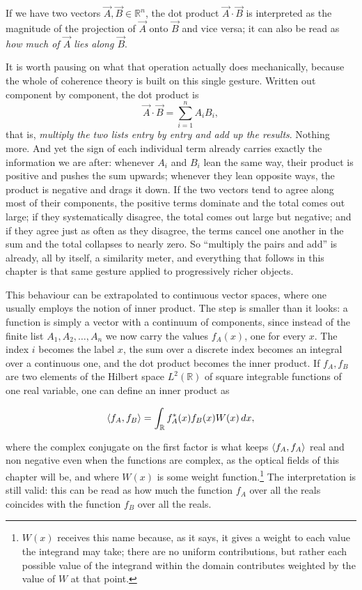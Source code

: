 	If we have two vectors $\vec{A},\vec{B} \in \mathbb{R}^n$, the dot product
	$\vec{A}\cdot\vec{B}$ is interpreted as the magnitude of the projection of $\vec{A}$ onto
	$\vec{B}$ and vice versa; it can also be read as \textit{how much of $\vec{A}$ lies along
	$\vec{B}$}.

	It is worth pausing on what that operation actually does mechanically, because the whole
	of coherence theory is built on this single gesture. Written out component by component,
	the dot product is
	\begin{equation}\label{eq:DotComponents}
		\vec{A}\cdot\vec{B} = \sum_{i=1}^{n} A_i B_i,
	\end{equation}
	that is, \textit{multiply the two lists entry by entry and add up the results}. Nothing
	more. And yet the sign of each individual term already carries exactly the information we
	are after: whenever $A_i$ and $B_i$ lean the same way, their product is positive and pushes
	the sum upwards; whenever they lean opposite ways, the product is negative and drags it
	down. If the two vectors tend to agree along most of their components, the positive terms
	dominate and the total comes out large; if they systematically disagree, the total comes
	out large but negative; and if they agree just as often as they disagree, the terms cancel
	one another in the sum and the total collapses to nearly zero. So ``multiply the pairs and
	add'' is already, all by itself, a similarity meter, and everything that follows in this
	chapter is that same gesture applied to progressively richer objects.

	This behaviour can be extrapolated to continuous vector spaces, where one
	usually employs the notion of inner product. The step is smaller than it looks: a function
	is simply a vector with a continuum of components, since instead of the finite list
	$A_1,A_2,\dots,A_n$ we now carry the values $f_A(x)$, one for every $x$. The index $i$
	becomes the label $x$, the sum over a discrete index becomes an integral over a continuous
	one, and the dot product becomes the inner product. If $f_A , f_B$ are two elements of the
	Hilbert space $L^2(\mathbb{R})$ of square integrable functions of one real variable, one
	can define an inner product as

	\begin{equation}\label{eq:ProdIn}
		\braket{f_A,f_B} = \int_\mathbb{R} f_A^*(x)f_B(x) W(x)\,dx,
	\end{equation}

	where the complex conjugate on the first factor is what keeps
	$\braket{f_A,f_A}$ real and non negative even when the functions are complex, as the
	optical fields of this chapter will be, and where $W(x)$ is some weight
	function.\footnote{$W(x)$ receives this name because, as it
	says, it gives a weight to each value the integrand may take; there are no uniform
	contributions, but rather each possible value of the integrand within the domain
	contributes weighted by the value of $W$ at that point.} The interpretation is still
	valid: this can be read as how much the function $f_A$ over all the reals coincides with
	the function $f_B$ over all the reals.

